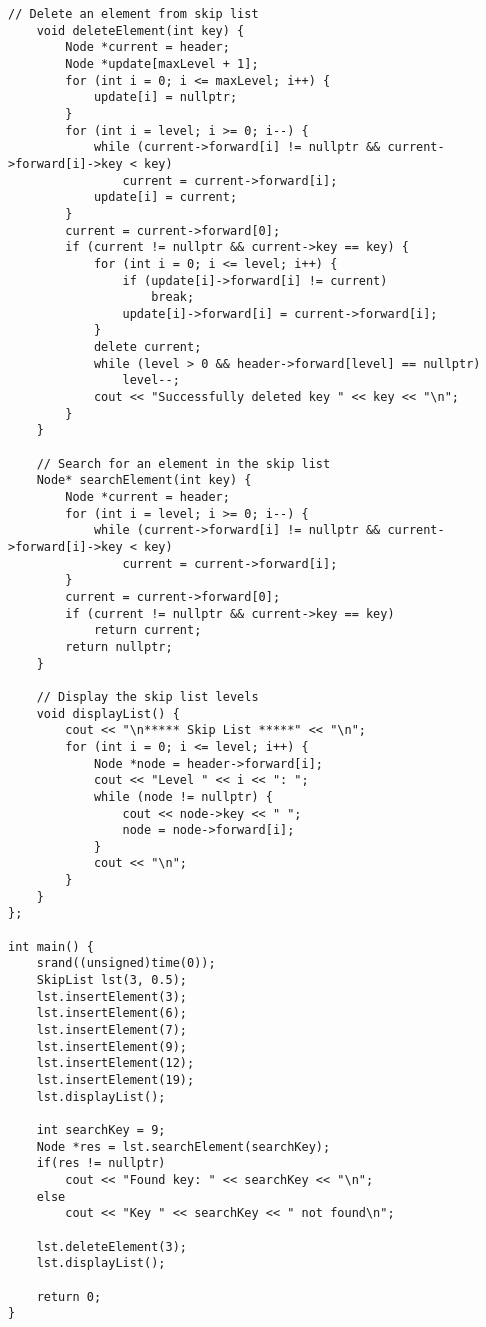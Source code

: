 \begin{lstlisting}[caption={C++ implementation of a Skip List}]
    // Delete an element from skip list
    void deleteElement(int key) {
        Node *current = header;
        Node *update[maxLevel + 1];
        for (int i = 0; i <= maxLevel; i++) {
            update[i] = nullptr;
        }
        for (int i = level; i >= 0; i--) {
            while (current->forward[i] != nullptr && current->forward[i]->key < key)
                current = current->forward[i];
            update[i] = current;
        }
        current = current->forward[0];
        if (current != nullptr && current->key == key) {
            for (int i = 0; i <= level; i++) {
                if (update[i]->forward[i] != current)
                    break;
                update[i]->forward[i] = current->forward[i];
            }
            delete current;
            while (level > 0 && header->forward[level] == nullptr)
                level--;
            cout << "Successfully deleted key " << key << "\n";
        }
    }
    
    // Search for an element in the skip list
    Node* searchElement(int key) {
        Node *current = header;
        for (int i = level; i >= 0; i--) {
            while (current->forward[i] != nullptr && current->forward[i]->key < key)
                current = current->forward[i];
        }
        current = current->forward[0];
        if (current != nullptr && current->key == key)
            return current;
        return nullptr;
    }
    
    // Display the skip list levels
    void displayList() {
        cout << "\n***** Skip List *****" << "\n";
        for (int i = 0; i <= level; i++) {
            Node *node = header->forward[i];
            cout << "Level " << i << ": ";
            while (node != nullptr) {
                cout << node->key << " ";
                node = node->forward[i];
            }
            cout << "\n";
        }
    }
};

int main() {
    srand((unsigned)time(0));
    SkipList lst(3, 0.5);
    lst.insertElement(3);
    lst.insertElement(6);
    lst.insertElement(7);
    lst.insertElement(9);
    lst.insertElement(12);
    lst.insertElement(19);
    lst.displayList();
    
    int searchKey = 9;
    Node *res = lst.searchElement(searchKey);
    if(res != nullptr)
        cout << "Found key: " << searchKey << "\n";
    else
        cout << "Key " << searchKey << " not found\n";
    
    lst.deleteElement(3);
    lst.displayList();
    
    return 0;
}
\end{lstlisting}

